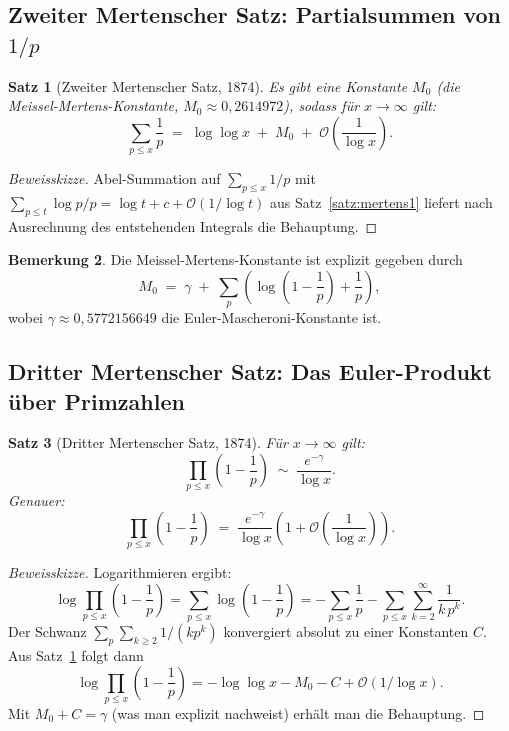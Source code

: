 \documentclass[12pt,a4paper]{amsart}
\newtheorem{theorem}{Satz}[section]
\theoremstyle{definition}
\newtheorem{bemerkung}[theorem]{Bemerkung}
\newcommand{\BigO}{\mathcal{O}}
\begin{document}
\subsection{Zweiter Mertenscher Satz: Partialsummen von \texorpdfstring{$1/p$}{1/p}}

\begin{theorem}[Zweiter Mertenscher Satz, 1874]
\label{satz:mertens2}
Es gibt eine Konstante $M_0$ (die \emph{Meissel-Mertens-Konstante},
$M_0 \approx 0{,}2614972$), sodass für $x \to \infty$ gilt:
\[
  \sum_{p \le x} \frac{1}{p} \;=\; \log\log x \;+\; M_0 \;+\; \BigO\!\left(\frac{1}{\log x}\right).
\]
\end{theorem}

\begin{proof}[Beweisskizze]
Abel-Summation auf $\sum_{p \le x}1/p$ mit
$\sum_{p \le t}\log p/p = \log t + c + \BigO(1/\log t)$
aus Satz~\ref{satz:mertens1} liefert nach Ausrechnung des entstehenden
Integrals die Behauptung.
\end{proof}

\begin{bemerkung}
Die Meissel-Mertens-Konstante ist explizit gegeben durch
\[
  M_0 \;=\; \gamma \;+\; \sum_p \!\left(\log\!\left(1-\frac{1}{p}\right) + \frac{1}{p}\right),
\]
wobei $\gamma \approx 0{,}5772156649$ die Euler-Mascheroni-Konstante ist.
\end{bemerkung}

\subsection{Dritter Mertenscher Satz: Das Euler-Produkt über Primzahlen}

\begin{theorem}[Dritter Mertenscher Satz, 1874]
\label{satz:mertens3}
Für $x \to \infty$ gilt:
\[
  \prod_{p \le x} \left(1 - \frac{1}{p}\right)
  \;\sim\; \frac{e^{-\gamma}}{\log x}.
\]
Genauer:
\[
  \prod_{p \le x} \left(1 - \frac{1}{p}\right)
  \;=\; \frac{e^{-\gamma}}{\log x}
        \left(1 + \BigO\!\left(\frac{1}{\log x}\right)\right).
\]
\end{theorem}

\begin{proof}[Beweisskizze]
Logarithmieren ergibt:
\[
  \log \prod_{p \le x}\!\left(1-\frac{1}{p}\right)
  = \sum_{p \le x}\log\!\left(1-\frac{1}{p}\right)
  = -\sum_{p \le x}\frac{1}{p}
    - \sum_{p \le x}\sum_{k=2}^{\infty}\frac{1}{k\,p^k}.
\]
Der Schwanz $\sum_p \sum_{k \ge 2}1/(kp^k)$ konvergiert absolut zu einer
Konstanten $C$.  Aus Satz~\ref{satz:mertens2} folgt dann
\[
  \log \prod_{p \le x}\!\left(1-\frac{1}{p}\right)
  = -\log\log x - M_0 - C + \BigO(1/\log x).
\]
Mit $M_0 + C = \gamma$ (was man explizit nachweist) erhält man die Behauptung.
\end{proof}
\end{document}
